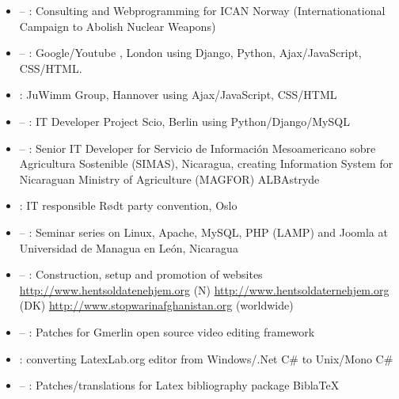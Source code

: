 \begin{itemize}
\item {} – : Consulting and Webprogramming for ICAN Norway (Internationational Campaign to Abolish Nuclear Weapons)
\item {} – : Google/Youtube \UK, London using Django, Python, Ajax/JavaScript, CSS/HTML.
\item {}: JuWimm Group, Hannover using Ajax/JavaScript, CSS/HTML
\item {} – : IT Developer Project Scio, Berlin using Python/Django/MySQL
\item {} – : Senior IT Developer for Servicio de Información Mesoamericano sobre Agricultura Sostenible (SIMAS), Nicaragua, creating  Information System for Nicaraguan Ministry of Agriculture (MAGFOR) ALBAstryde
\item {}: IT responsible Rødt party convention, Oslo
\item {} – : Seminar series on Linux, Apache, MySQL, PHP (LAMP) and Joomla at Universidad de Managua en León, Nicaragua
\item {} – : Construction, setup and promotion of websites \href{http://www.hentsoldatenehjem.org}{http://www.hentsoldatenehjem.org} (N) \href{http://www.hentsoldaternehjem.org}{http://www.hentsoldaternehjem.org} (DK) \href{http://www.stopwarinafghanistan.org}{http://www.stopwarinafghanistan.org} (worldwide)
\item {} – : Patches for Gmerlin open source video editing framework
\item {}: converting LatexLab.org editor from Windows/.Net C\# to Unix/Mono C\#
\item {} – : Patches/translations for Latex bibliography package BiblaTeX


\end{itemize}
